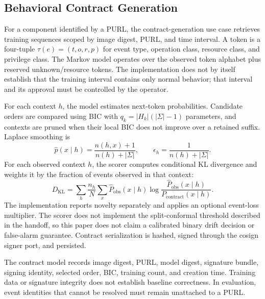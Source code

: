 \documentclass[conference]{IEEEtran}
\begin{document}
\subsection{Behavioral Contract Generation}
For a component identified by a PURL, the contract-generation use case retrieves training sequences scoped by image digest, PURL, and time interval. A token is a four-tuple $\tau(e)=(t,o,r,p)$ for event type, operation class, resource class, and privilege class. The Markov model operates over the observed token alphabet plus reserved unknown/resource tokens. The implementation does not by itself establish that the training interval contains only normal behavior; that interval and its approval must be controlled by the operator.

For each context $h$, the model estimates next-token probabilities. Candidate orders are compared using BIC with $q_k=|H_k|(|\Sigma|-1)$ parameters, and contexts are pruned when their local BIC does not improve over a retained suffix. Laplace smoothing is
\begin{equation}
\hat p(x\mid h)=\frac{n(h,x)+1}{n(h)+|\Sigma|},\qquad \epsilon_h=\frac{1}{n(h)+|\Sigma|}.
\label{eq:laplace}
\end{equation}
For each observed context $h$, the scorer computes conditional KL divergence and weights it by the fraction of events observed in that context:
\begin{equation}
D_{\mathrm{KL}}=\sum_h\frac{n_h}{N}\sum_x \widehat P_{\mathrm{obs}}(x\mid h)\log\frac{\widehat P_{\mathrm{obs}}(x\mid h)}{P_{\mathrm{contract}}(x\mid h)}.
\label{eq:kl}
\end{equation}
The implementation reports novelty separately and applies an optional event-loss multiplier. The scorer does not implement the split-conformal threshold described in the handoff, so this paper does not claim a calibrated binary drift decision or false-alarm guarantee. Contract serialization is hashed, signed through the cosign signer port, and persisted.

The contract model records image digest, PURL, model digest, signature bundle, signing identity, selected order, BIC, training count, and creation time. Training data or signature integrity does not establish baseline correctness. In evaluation, event identities that cannot be resolved must remain unattached to a PURL.
\end{document}
